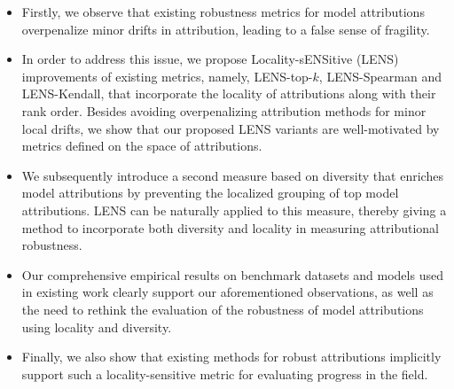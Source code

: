 \documentclass[letterpaper]{article} %
\begin{document}
\begin{itemize}[leftmargin=*]
\setlength\itemsep{-0.06em}
\item Firstly, we observe that existing robustness metrics for model attributions overpenalize minor drifts in attribution, leading to a false sense of fragility. %
\item In order to address this issue, we propose Locality-sENSitive (LENS) improvements of existing metrics, namely, LENS-top-$k$, LENS-Spearman and LENS-Kendall, that incorporate the locality of attributions along with their rank order. Besides avoiding overpenalizing attribution methods for minor local drifts, we show that our proposed LENS variants are well-motivated by metrics defined on the space of attributions. %
\item We subsequently introduce a second measure based on diversity that enriches model attributions by preventing the localized grouping of top model attributions. LENS can be naturally applied to this measure, thereby giving a method to incorporate both diversity and locality in measuring attributional robustness.
\item Our comprehensive empirical results on benchmark datasets and models used in existing work clearly support our aforementioned observations, as well as the need to rethink the evaluation of the robustness of model attributions using locality and diversity.
\item Finally, we also show that existing methods for robust attributions implicitly support such a locality-sensitive metric for evaluating progress in the field.
\end{itemize}
\end{document}
